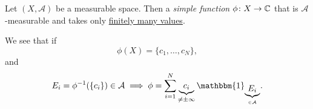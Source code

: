 \begin{definition}\label{def:simple-function}
	Let \((X, \mathcal{A} )\) be a measurable space. Then a \emph{simple function} \(\phi \colon X\to \mathbb{\MakeUppercase{c}} \) that
	is \(\mathcal{A} \)-measurable and takes only \underline{finitely many values}.
\end{definition}
\begin{remark}
	We see that if
	\[
		\phi (X) = \{c_1, \ldots , c_N \},
	\]
	and
	\[
		E_{i}= \phi ^{-1} (\{c_{i}\})\in \mathcal{A} \implies \phi = \sum\limits_{i=1}^{N} \underbrace{c_{i}}_{\neq \pm \infty }\mathbbm{1}_{\underbrace{E_{i}}_{\in \mathcal{A}}}.
	\]
\end{remark}